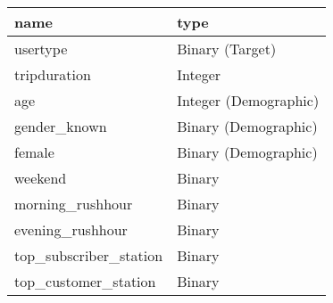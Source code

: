 \begin{table}[ht]
\begin{heightresizeenv}
\begin{tabular}{ll}
  \toprule
name & type \\ 
  \midrule
usertype & Binary (Target) \\ 
  tripduration & Integer \\ 
  age & Integer (Demographic) \\ 
  gender\_known & Binary (Demographic) \\ 
  female & Binary (Demographic) \\ 
  weekend & Binary \\ 
  morning\_rushhour & Binary \\ 
  evening\_rushhour & Binary \\ 
  top\_subscriber\_station & Binary \\ 
  top\_customer\_station & Binary \\ 
   \bottomrule
\end{tabular}
\end{heightresizeenv}
\end{table}
